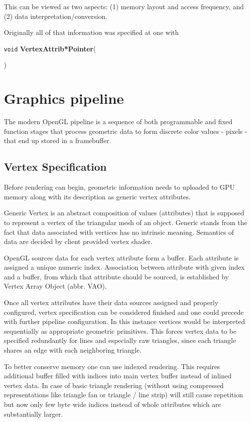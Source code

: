This can be viewed as two aspects: (1) memory layout and access frequency, and (2) data interpretation/conversion.

Originally all of that information was specified at one with
\begin{center}
    \texttt{void} \textbf{VertexAttrib*Pointer}(

    )
\end{center}

\section{Graphics pipeline}
The modern OpenGL pipeline is a sequence of both programmable and fixed function stages that process geometric data to form discrete color values - pixels - that end up stored in a framebuffer. 

\subsection{Vertex Specification}

Before rendering can begin, geometric information needs to uploaded to GPU memory along with its description as generic vertex attributes.

Generic Vertex is an abstract composition of values (attributes) that is supposed to represent a vertex of the triangular mesh of an object.
Generic stands from the fact that data associated with vertices has no intrinsic meaning.
Semantics of data are decided by client provided vertex shader.

OpenGL sources data for each vertex attribute form a buffer. Each attribute is assigned a unique numeric index.
Association between attribute with given index and a buffer, from which that attribute should be sourced, is established by Vertex Array Object (abbr. VAO).

Once all vertex attributes have their data sources assigned and properly configured, vertex specification can be considered finished and one could precede with further pipeline configuration.
In this instance vertices would be interpreted sequentially as appropriate geometric primitives. This forces vertex data to be specified redundantly for 
lines and especially raw triangles, since each triangle shares an edge with each neighboring triangle.

To better conserve memory one can use indexed rendering. This requires additional buffer filled with indices into main vertex buffer instead of inlined vertex data.
In case of basic triangle rendering (without using compressed representations like triangle fan or triangle / line strip) will still cause repetition but now only few byte wide indices instead of whole attributes which are substantially larger.

